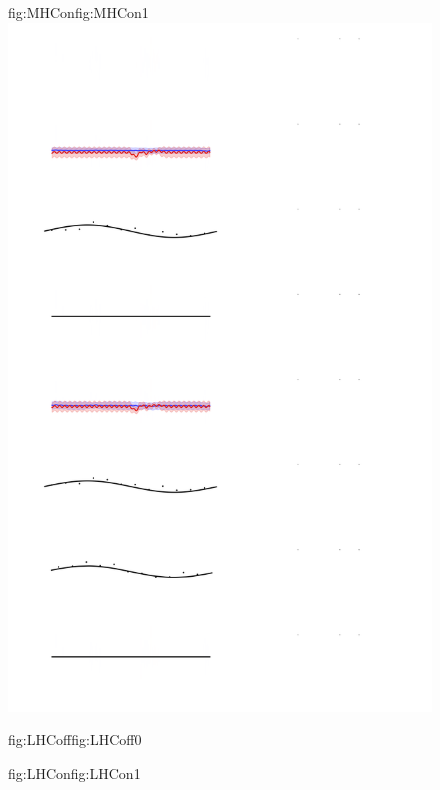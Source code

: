 \begin{figure}
\begin{ocg}{fig:MHCon}{fig:MHCon}{1}
  \includegraphics[width=0.8\hsize]{figures/analysisHC161_models.png}%
  \end{ocg}
  \hspace{-0.8\hsize}%
  \begin{ocg}{fig:LHCoff}{fig:LHCoff}{0}%
  \end{ocg}%
  \begin{ocg}{fig:LHCon}{fig:LHCon}{1}%

\end{ocg}
\end{figure}
